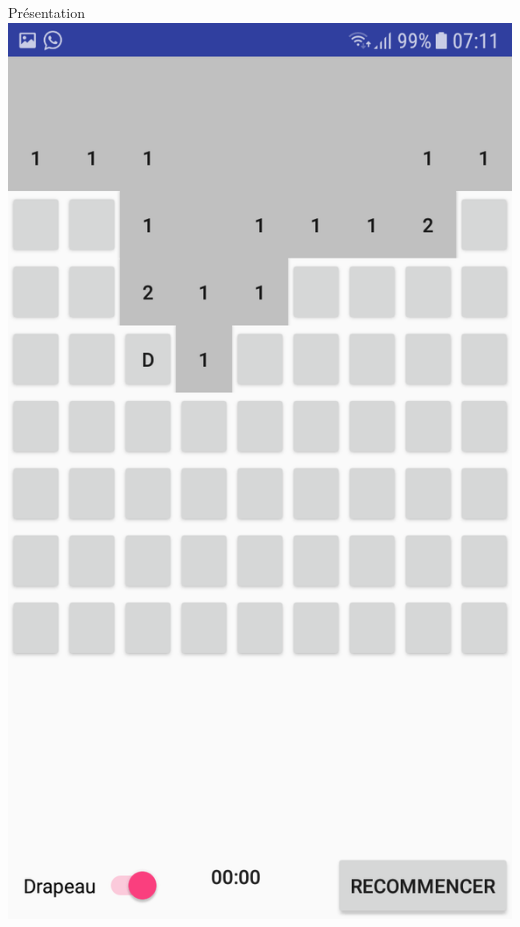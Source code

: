 \documentclass{beamer}
\begin{document}
\begin{frame}
\begin{block}{Présentation}
    \includegraphics[scale=0.15]{Images/2.png}

\end{block}
\end{frame}
\end{document}
